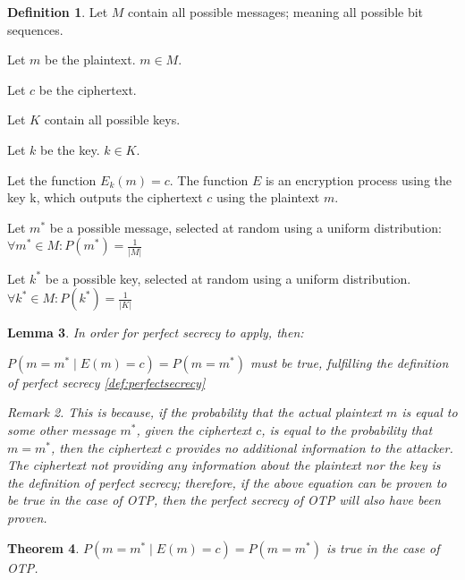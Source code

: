 \documentclass[12pt]{report}
\newtheorem{thm}{Theorem}[section]
\newtheorem{lemma}[thm]{Lemma}
\theoremstyle{definition}
\newtheorem{defin}[thm]{Definition}
\theoremstyle{remark}
\newtheorem{rem}[thm]{Remark}
\begin{document}
\begin{defin}
Let $M$ contain all possible messages; meaning all possible bit sequences.

Let $m$ be the plaintext. $m \in M$.

Let $c$ be the ciphertext.

Let $K$ contain all possible keys.

Let $k$ be the key. $k \in K$.

Let the function ${E_k}(m)=c$. The function $E$ is an encryption process using the key k, which outputs the ciphertext $c$ using the plaintext $m$.

Let $m^{*}$ be a possible message, selected at random using a uniform distribution:
$\forall m^{*} \in M: P(m^{*})=\frac{1}{\lvert M \rvert}$

Let $k^{*}$ be a possible key, selected at random using a uniform distribution.
$\forall k^{*} \in M: P(k^{*})=\frac{1}{\lvert K \rvert}$
\end{defin}

\begin{lemma}
In order for perfect secrecy to apply, then:

$P( m=m^{*} \mid E(m)=c ) = P( m=m^{*} )$
must be true, fulfilling the definition of perfect secrecy \ref{def:perfectsecrecy}

\begin{rem}
This is because, if the probability that the actual plaintext $m$ is equal to some other message $m^{*}$, given the ciphertext $c$, is equal to the probability that $m=m^{*}$, then the ciphertext $c$ provides no additional information to the attacker. The ciphertext not providing any information about the plaintext nor the key is the definition of perfect secrecy; therefore, if the above equation can be proven to be true in the case of OTP, then the perfect secrecy of OTP will also have been proven.
\end{rem}
\end{lemma}

\begin{thm}
$P( m=m^{*} \mid E(m)=c ) = P( m=m^{*} )$ is true in the case of OTP.
\end{thm}
\end{document}
